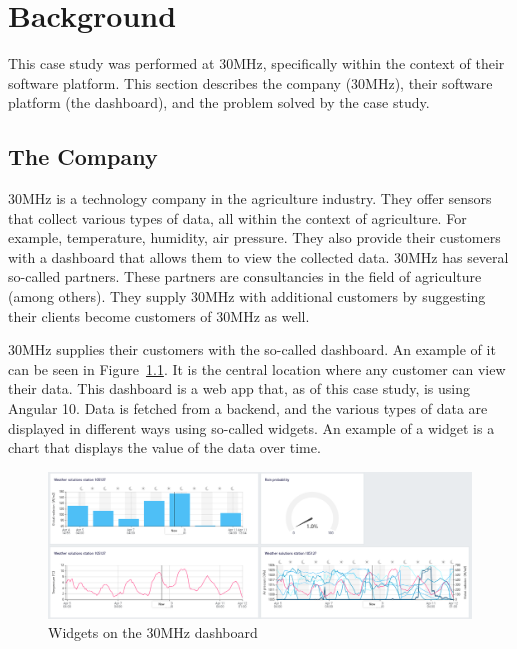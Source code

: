 \chapter{Background}\label{chap:background}

This case study was performed at 30MHz, specifically within the context of their software platform. This section describes the company (30MHz), their software platform (the dashboard), and the problem solved by the case study.

\section{The Company}\label{sec:bg:thecompany}
30MHz is a technology company in the agriculture industry. They offer sensors that collect various types of data, all within the context of agriculture. For example, temperature, humidity, air pressure. They also provide their customers with a dashboard that allows them to view the collected data. 30MHz has several so-called partners. These partners are consultancies in the field of agriculture (among others). They supply 30MHz with additional customers by suggesting their clients become customers of 30MHz as well.

30MHz supplies their customers with the so-called dashboard. An example of it can be seen in Figure~\ref{fig:bg:dashboard}. It is the central location where any customer can view their data. This dashboard is a web app that, as of this case study, is using Angular 10. Data is fetched from a backend, and the various types of data are displayed in different ways using so-called widgets. An example of a widget is a chart that displays the value of the data over time.

\begin{figure}[h]
  \includegraphics[width=\columnwidth]{figures/background/dashboard.png}
  \caption{Widgets on the 30MHz dashboard}
  \label{fig:bg:dashboard}
  \centering
\end{figure}

